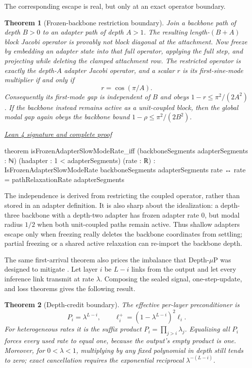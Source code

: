\documentclass[11pt]{article}
\newtheorem{theorem}{Theorem}[section]
\newcommand{\leancommit}{f3a31db36bb2f944312ee31c1d86c2758109e83a}
\newcommand{\leansignaturelink}[2]{%
  \par\Needspace{0.3\textheight}\smallskip\noindent
  \href{https://github.com/zariuq/MeTTapedia/blob/\leancommit/#1\#L#2}{%
    \scriptsize\itshape Lean 4 signature and complete proof}\par\nobreak}
\begin{document}
The corresponding escape is real, but only at an exact operator boundary.

\begin{theorem}[Frozen-backbone restriction boundary]\label{cor:adapter}
Join a backbone path of depth $B>0$ to an adapter path of depth $A>1$.  The resulting
length-$(B+A)$ block Jacobi operator is provably not block diagonal at the attachment.
Now freeze by embedding an adapter state into that full operator, applying the full
step, and projecting while deleting the clamped attachment row.  The restricted
operator is exactly the depth-$A$ adapter Jacobi operator, and a scalar $r$ is its
first-sine-mode multiplier if and only if
\[
r=\cos(\pi/A).
\]
Consequently its first-mode gap is independent of $B$ and obeys
$1-r\le\pi^2/(2A^2)$.  If the backbone instead remains active as a unit-coupled block,
then the global modal gap again obeys the backbone bound
$1-\rho\le\pi^2/(2B^2)$.
\end{theorem}

\leansignaturelink{lean/mettapedia/Mettapedia/MachineLearning/NeuralNetworks/%
PredictiveCoding/FrozenAdapterRestriction.lean}{233}
\begin{leansignature}
theorem isFrozenAdapterSlowModeRate_iff
    (backboneSegments adapterSegments : ℕ)
    (hadapter : 1 < adapterSegments) (rate : ℝ) :
    IsFrozenAdapterSlowModeRate backboneSegments adapterSegments rate ↔
      rate = pathRelaxationRate adapterSegments
\end{leansignature}

The independence is derived from restricting the coupled operator, rather than stored
in an adapter definition.  It is also sharp about the idealization: a depth-three
backbone with a depth-two adapter has frozen adapter rate $0$, but modal radius $1/2$
when both unit-coupled paths remain active.  Thus shallow adapters escape only when
freezing really deletes the backbone coordinates from settling; partial freezing or a
shared active relaxation can re-import the backbone depth.

The same first-arrival theorem also prices the imbalance that Depth-$\mu$P was designed
to mitigate \cite{innocentimupc2025}.  Let layer $i$ be $L-i$ links from the output and
let every inference link transmit at rate $\lambda$.  Composing the sealed signal,
one-step-update, and loss theorems gives the following result.

\begin{theorem}[Depth-credit boundary]\label{thm:mupcdepth}
The effective per-layer preconditioner is
\[
P_i=\lambda^{L-i},
\qquad
\ell_i^+=(1-\lambda^{L-i})^2\ell_i.
\]
For heterogeneous rates it is the suffix product $P_i=\prod_{j>i}\lambda_j$.  Equalizing
all $P_i$ forces every used rate to equal one, because the output's empty product is one.
Moreover, for $0<\lambda<1$, multiplying by any fixed polynomial in depth still tends to
zero; exact cancellation requires the exponential reciprocal $\lambda^{-(L-i)}$.
\end{theorem}
\end{document}
